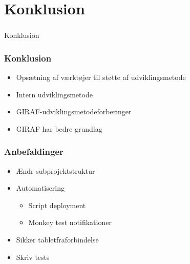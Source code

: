 \section[Konklusion]{Konklusion}

\begin{frame}
  \frametitle{}
  \begin{center}
    {\Huge Konklusion}
  \end{center}
\end{frame}

\begin{frame}
  \frametitle{Konklusion}
  \begin{itemize}
    \item Opsætning af værktøjer til støtte af udviklingsmetode
    \item Intern udviklingsmetode
    \item GIRAF-udviklingsmetodeforberinger
    \item GIRAF har bedre grundlag
  \end{itemize}
\end{frame}

\begin{frame}
  \frametitle{Anbefaldinger}
  \begin{itemize}
    \item Ændr subprojektstruktur
    \item Automatisering 
    \begin{itemize}
      \item Script deployment
      \item Monkey test notifikationer
    \end{itemize}
    \item Sikker tabletfraforbindelse
    \item Skriv tests
  \end{itemize}
\end{frame}

